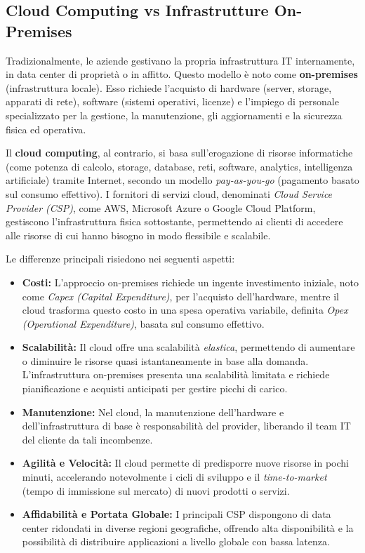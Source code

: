 \subsection{Cloud Computing vs Infrastrutture On-Premises}
\label{sec:cloud-vs-onprem}

Tradizionalmente, le aziende gestivano la propria infrastruttura IT internamente, in data center di proprietà o in affitto. Questo modello è noto come \textbf{on-premises} (infrastruttura locale). Esso richiede l'acquisto di hardware (server, storage, apparati di rete), software (sistemi operativi, licenze) e l'impiego di personale specializzato per la gestione, la manutenzione, gli aggiornamenti e la sicurezza fisica ed operativa.

Il \textbf{cloud computing}, al contrario, si basa sull'erogazione di risorse informatiche (come potenza di calcolo, storage, database, reti, software, analytics, intelligenza artificiale) tramite Internet, secondo un modello \textit{pay-as-you-go} (pagamento basato sul consumo effettivo). I fornitori di servizi cloud, denominati \textit{Cloud Service Provider (CSP)}, come AWS, Microsoft Azure o Google Cloud Platform, gestiscono l'infrastruttura fisica sottostante, permettendo ai clienti di accedere alle risorse di cui hanno bisogno in modo flessibile e scalabile.

Le differenze principali risiedono nei seguenti aspetti:
\begin{itemize}
    \item \textbf{Costi:} L'approccio on-premises richiede un ingente investimento iniziale, noto come \textit{Capex (Capital Expenditure)}, per l'acquisto dell'hardware, mentre il cloud trasforma questo costo in una spesa operativa variabile, definita \textit{Opex (Operational Expenditure)}, basata sul consumo effettivo.
    \item \textbf{Scalabilità:} Il cloud offre una scalabilità \textit{elastica}, permettendo di aumentare o diminuire le risorse quasi istantaneamente in base alla domanda. L'infrastruttura on-premises presenta una scalabilità limitata e richiede pianificazione e acquisti anticipati per gestire picchi di carico.
    \item \textbf{Manutenzione:} Nel cloud, la manutenzione dell'hardware e dell'infrastruttura di base è responsabilità del provider, liberando il team IT del cliente da tali incombenze.
    \item \textbf{Agilità e Velocità:} Il cloud permette di predisporre nuove risorse in pochi minuti, accelerando notevolmente i cicli di sviluppo e il \textit{time-to-market} (tempo di immissione sul mercato) di nuovi prodotti o servizi.
    \item \textbf{Affidabilità e Portata Globale:} I principali CSP dispongono di data center ridondati in diverse regioni geografiche, offrendo alta disponibilità e la possibilità di distribuire applicazioni a livello globale con bassa latenza.
\end{itemize}


